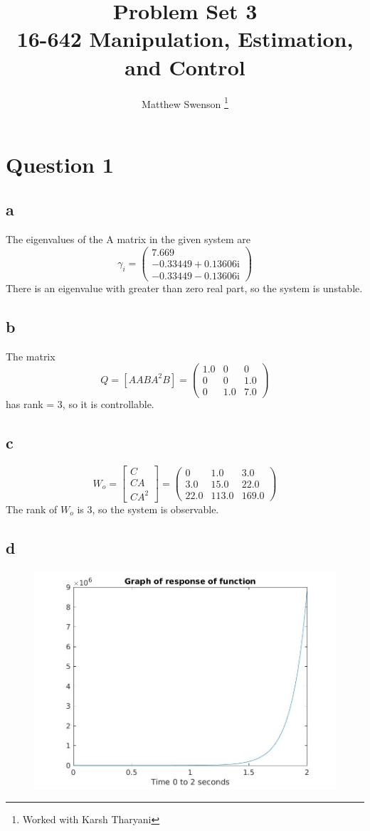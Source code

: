 \documentclass[11pt]{article}
\title{Problem Set 3\\ \vspace{2mm}\Large{16-642 Manipulation, Estimation, and Control}}
\author{Matthew Swenson \thanks{Worked with Karsh Tharyani}}
\begin{document}
	\maketitle
	
\section*{Question 1}
\subsection*{a}
The eigenvalues of the A matrix in the given system are 
$$
\gamma_i=
\left(\begin{array}{c} 7.669\\ -0.33449+0.13606{}\mathrm{i}\\ -0.33449-0.13606{}\mathrm{i} \end{array}\right)
$$
There is an eigenvalue with greater than zero real part, so the system is unstable.
\subsection*{b}
The matrix $$ Q =[A AB A^2B]=
    \left(\begin{array}{ccc} 1.0 & 0 & 0\\ 0 & 0 & 1.0\\ 0 & 1.0 & 7.0 \end{array}\right)$$
has rank = 3, so it is controllable.
\subsection*{c}
$$ W_o=\begin{bmatrix}C\\CA\\CA^2\end{bmatrix}=\left(\begin{array}{ccc} 0 & 1.0 & 3.0\\ 3.0 & 15.0 & 22.0\\ 22.0 & 113.0 & 169.0 \end{array}\right)$$
     The rank of $W_o$ is 3, so the system is observable.
\subsection*{d}
\begin{figure}[H]
    \includegraphics[width=.7\textwidth]{q1d.jpg}
\end{figure}
\end{document}
